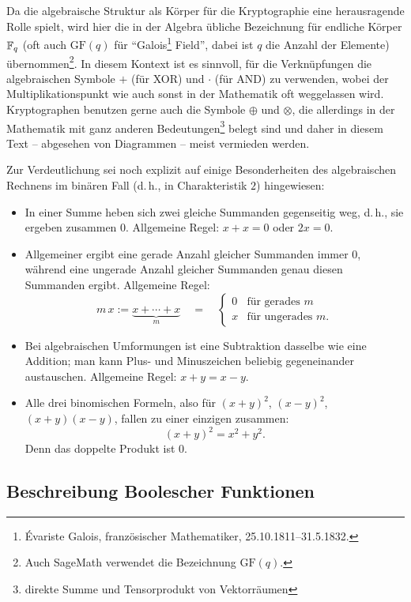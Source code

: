 \begin{refsegment}
Da die algebraische Struktur als Körper für die Kryptographie
eine herausragende Rolle spielt, wird hier die in der Algebra übliche
Bezeichnung für endliche Körper $\mathbb{F}_q$ (oft
auch $\text{GF}(q)$ für "`Galois\footnote{%
  Évariste Galois, französischer Mathematiker,
  25.10.1811--31.5.1832.
}
Field"', dabei ist $q$ die Anzahl der Elemente) übernommen\footnote{%
  Auch SageMath verwendet die Bezeichnung $\text{GF}(q)$.
}.
In diesem Kontext ist es sinnvoll, für die
Verknüpfungen die algebraischen Symbole $+$ (für XOR) und
$\cdot$ (für AND) zu verwenden, wobei der Multiplikationspunkt wie
auch sonst in der Mathematik oft weggelassen wird. Kryptographen benutzen
gerne auch die Symbole $\oplus$ und $\otimes$, die allerdings in der
Mathematik mit ganz anderen Bedeutungen\footnote{%
  direkte Summe und Tensorprodukt von Vektorräumen
}
belegt sind und daher in diesem Text -- abgesehen von Diagrammen --
meist vermieden werden.

Zur Verdeutlichung sei noch explizit auf einige Besonderheiten des
algebraischen Rechnens im binären Fall (d.\,h., in Charakteristik $2$)
hingewiesen:
\begin{itemize}
   \item In einer Summe heben sich zwei gleiche Summanden gegenseitig
      weg, d.\,h., sie ergeben zusammen $0$. Allgemeine Regel: $x + x = 0$
      oder $2x = 0$.
   \item Allgemeiner ergibt eine gerade Anzahl gleicher Summanden immer $0$,
      während eine ungerade Anzahl gleicher Summanden genau diesen Summanden
      ergibt. Allgemeine Regel:
\[
         m \, x := \underbrace{x + \cdots + x}_m \quad = \quad
            \begin{cases}
               0 & \text{für gerades } m \\ x & \text{für ungerades } m.
            \end{cases}
\]
   \item Bei algebraischen Umformungen ist eine Subtraktion dasselbe wie
      eine Addition; man kann Plus- und Minuszeichen beliebig gegeneinander
      austauschen. Allgemeine Regel: $x + y = x - y$.
   \item Alle drei binomischen Formeln, also für $(x + y)^2$, $(x - y)^2$,
      $(x + y)(x - y)$, fallen zu einer einzigen zusammen:
\[
         (x + y)^2 = x^2 + y^2.
\]
      Denn das doppelte Produkt ist $0$.
\end{itemize}


\subsection{Beschreibung Boolescher Funktionen}\label{ss-bool-descr}


\end{refsegment}
